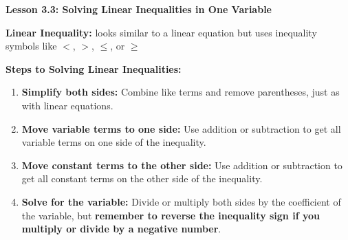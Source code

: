  \begin{center}
\textbf{Lesson 3.3: Solving Linear Inequalities in One Variable}
\end{center}

\vspace*{1ex}

\noindent\textbf{Linear Inequality:} looks similar to a linear equation but uses inequality symbols like $<$, $>$, $\leq$, or $\geq$

\noindent\textbf{Steps to Solving Linear Inequalities:}
\begin{enumerate}[noitemsep, label = \color{blue}\arabic*. ]
    \item \textbf{Simplify both sides:} Combine like terms and remove parentheses, just as with linear equations.
    \item \textbf{Move variable terms to one side:} Use addition or subtraction to get all variable terms on one side of the inequality.
    \item \textbf{Move constant terms to the other side:} Use addition or subtraction to get all constant terms on the other side of the inequality.
    \item \textbf{Solve for the variable:} Divide or multiply both sides by the coefficient of the variable, but \textbf{remember to reverse the inequality sign if you multiply or divide by a negative number}.
\end{enumerate}

